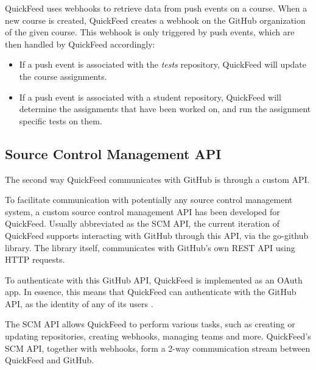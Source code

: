 QuickFeed uses webhooks to retrieve data from push events on a course.
When a new course is created, QuickFeed creates a webhook on the GitHub organization of the given course.
This webhook is only triggered by push events, which are then handled by QuickFeed accordingly:

\begin{itemize}
    \item If a push event is associated with the \textit{tests} repository, QuickFeed will update the course assignments.
    \item If a push event is associated with a student repository, QuickFeed will determine the assignments that have been worked on,
    and run the assignment specific tests on them.
\end{itemize}

\subsection{Source Control Management API}

The second way QuickFeed communicates with GitHub is through a custom API.

To facilitate communication with potentially any source control management system, a custom source control management API has been developed for QuickFeed.
Usually abbreviated as the SCM API, the current iteration of QuickFeed supports interacting with GitHub through this API, via the go-github library.
The library itself, communicates with GitHub's own REST API using HTTP requests.

To authenticate with this GitHub API, QuickFeed is implemented as an OAuth app.
In essence, this means that QuickFeed can authenticate with the GitHub API, as the identity of any of its users \cite{apps}.

The SCM API allows QuickFeed to perform various tasks, such as creating or updating repositories, creating webhooks, managing teams and more.
QuickFeed's SCM API, together with webhooks, form a 2-way communication stream between QuickFeed and GitHub.